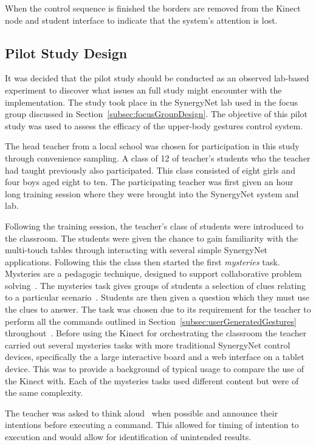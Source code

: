 \documentclass[link]{IWCOMP}
\begin{document}
When the control sequence is finished the borders are removed from the Kinect node and student interface to indicate that the system's attention is lost.

\subsection{Pilot Study Design}
\label{subsec:pilotStudyDesign}

It was decided that the pilot study should be conducted as an observed lab-based experiment to discover what issues an full study might encounter with the implementation.
The study took place in the SynergyNet lab used in the focus group discussed in Section~\ref{subsec:focusGroupDesign}.
The objective of this pilot study was used to assess the efficacy of the upper-body gestures control system.

The head teacher from a local school was chosen for participation in this study through convenience sampling.
A class of 12 of teacher's students who the teacher had taught previously also participated.
This class consisted of eight girls and four boys aged eight to ten.
The participating teacher was first given an hour long training session where they were brought into the SynergyNet system and lab.  

Following the training session, the teacher's class of students were introduced to the classroom.
The students were given the chance to gain familiarity with the multi-touch tables through interacting with several simple SynergyNet applications.
Following this the class then started the first \textit{mysteries} task.
Mysteries are a pedagogic technique, designed to support collaborative problem solving~\citep{Leat2002}.
The mysteries task gives groups of students a selection of clues relating to a particular scenario~\citep{Higgins2011b}.
Students are then given a question which they must use the clues to answer.
The task was chosen due to its requirement for the teacher to perform all the commands outlined in Section~\ref{subsec:userGeneratedGestures} throughout~\citep{Mercier2012}.
Before using the Kinect for orchestrating the classroom the teacher carried out several mysteries tasks with more traditional SynergyNet control devices, specifically the a large interactive board and a web interface on a tablet device.
This was to provide a background of typical usage to compare the use of the Kinect with.
Each of the mysteries tasks used different content but were of the same complexity.  

The teacher was asked to think aloud~\cite{jaaskelainen2010think} when possible and announce their intentions before executing a command.  
This allowed for timing of intention to execution and would allow for identification of unintended results.
\end{document}
